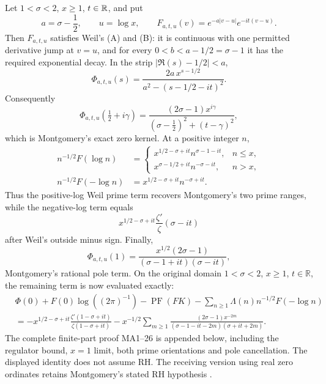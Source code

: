 \begin{theorem}
\label{thm:montgomery-weil-poisson-complete}
Let $1<\sigma<2$, $x\geq1$, $t\in\mathbb R$, and put
\[
 a=\sigma-\frac12,\qquad u=\log x,\qquad
 F_{a,t,u}(v)=e^{-a|v-u|}e^{-it(v-u)}.
\]
Then $F_{a,t,u}$ satisfies Weil's (A) and (B): it is continuous with one
permitted derivative jump at $v=u$, and for every
$0<b<a-1/2=\sigma-1$ it has the required exponential decay.  In the strip
$|\Re(s)-1/2|<a$,
\begin{equation}
 \Phi_{a,t,u}(s)
 =\frac{2a\,x^{s-1/2}}
 {a^2-(s-1/2-it)^2}.
 \label{eq:poisson-transform-complete}
\end{equation}
Consequently
\begin{equation}
 \Phi_{a,t,u}(\tfrac12+i\gamma)
 =\frac{(2\sigma-1)x^{i\gamma}}
 { (\sigma-\tfrac12)^2+(t-\gamma)^2},
 \label{eq:poisson-zero-complete}
\end{equation}
which is Montgomery's exact zero kernel.  At a positive integer $n$,
\begin{align}
 n^{-1/2}F(\log n)
 &=\begin{cases}
 x^{1/2-\sigma+it}n^{\sigma-1-it},&n\leq x,\\
 x^{\sigma-1/2+it}n^{-\sigma-it},&n>x,
 \end{cases}\label{eq:poisson-positive-prime-complete}\\
 n^{-1/2}F(-\log n)
 &=x^{1/2-\sigma+it}n^{-\sigma+it}.
 \label{eq:poisson-negative-prime-complete}
\end{align}
Thus the positive-log Weil prime term recovers Montgomery's two prime ranges,
while the negative-log term equals
\begin{equation}
 x^{1/2-\sigma+it}\frac{\zeta'}{\zeta}(\sigma-it)
 \label{eq:poisson-logderivative-complete}
\end{equation}
after Weil's outside minus sign.  Finally,
\begin{equation}
 \Phi_{a,t,u}(1)
 =\frac{x^{1/2}(2\sigma-1)}
 { (\sigma-1+it)(\sigma-it)},
 \label{eq:poisson-pole-complete}
\end{equation}
Montgomery's rational pole term. On the original domain $1<\sigma<2$, $x\ge1$, $t\in\mathbb R$, the
remaining term is now evaluated exactly:
\[
\begin{aligned}
 &\Phi(0)+F(0)\log((2\pi)^{-1})-\operatorname{PF}(FK)
 -\sum_{n\ge1}\Lambda(n)n^{-1/2}F(-\log n)\\
 &=-x^{1/2-\sigma+it}\frac{\zeta'(1-\sigma+it)}{\zeta(1-\sigma+it)}
 -x^{-1/2}\sum_{m\ge1}
 \frac{(2\sigma-1)x^{-2m}}{(\sigma-1-it-2m)(\sigma+it+2m)}.
\end{aligned}
\]
The complete finite-part proof MA1--26 is appended below, including the
regulator bound, $x=1$ limit, both prime orientations and pole cancellation.
The displayed identity does not assume RH. The receiving version using real
zero ordinates retains Montgomery's stated RH hypothesis
\cite[pp.~185--187, equations (18)--(22)]{montgomery1973}.
\end{theorem}

